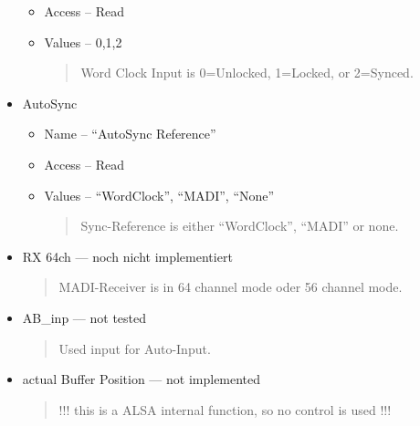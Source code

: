 \documentclass[a4paper,8pt,english]{sphinxmanual}
\begin{document}
\begin{itemize}
\begin{itemize}
\item {} 
Access -- Read

\item {} 
Values -- 0,1,2
\begin{quote}

Word Clock Input is 0=Unlocked, 1=Locked, or 2=Synced.
\end{quote}

\end{itemize}

\item {} 
AutoSync
\begin{itemize}
\item {} 
Name -- ``AutoSync Reference''

\item {} 
Access -- Read

\item {} 
Values -- ``WordClock'', ``MADI'', ``None''
\begin{quote}

Sync-Reference is either ``WordClock'', ``MADI'' or none.
\end{quote}

\end{itemize}

\item {} 
RX 64ch --- noch nicht implementiert
\begin{quote}

MADI-Receiver is in 64 channel mode oder 56 channel mode.
\end{quote}

\item {} 
AB\_inp   --- not tested
\begin{quote}

Used input for Auto-Input.
\end{quote}

\item {} 
actual Buffer Position --- not implemented
\begin{quote}

!!! this is a ALSA internal function, so no control is used !!!
\end{quote}

\end{itemize}
\end{document}
